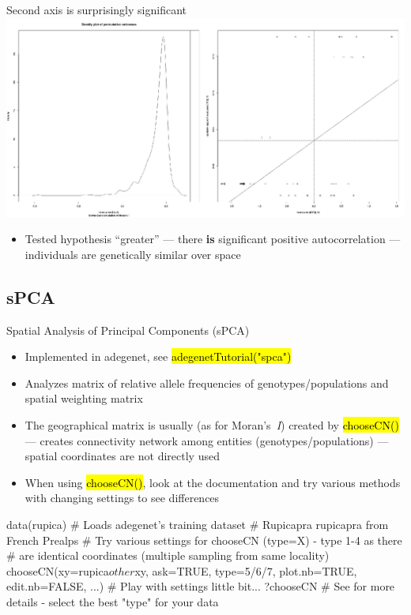 \documentclass[compress, ucs, xelatex, 11pt, xcolor=svgnames,
	hyperref={
		bookmarks=true,
		unicode=true,
		colorlinks=true,
		pdftitle={Molecular data in R},
		plainpages=false,
		pdfauthor={Vojtech Zeisek},
		pdfsubject={Course about phylogeny and evolution in R},
		pdfcreator={XeLaTeX},
		pdfkeywords={R, evolution, phylogeny, molecular data},
		linkcolor=Tomato,
		anchorcolor=SaddleBrown,
		citecolor=Goldenrod,
		filecolor=DarkMagenta,
		menucolor=Sienna,
		urlcolor=DarkTurquoise,
		pdftex},
	url={hyphens, lowtilde} %
	]{beamer}
\renewcommand{\texttt}[1]{\hl{\ttfamily #1}}
\begin{document}
\begin{frame}{Second axis is surprisingly significant}
	\includegraphics[width=\textwidth]{moran2.png}
	\begin{itemize}
		\item Tested hypothesis ``greater'' --- there \textbf{is} significant positive autocorrelation --- individuals are genetically similar over space
	\end{itemize}
\end{frame}

\subsection{sPCA}

\begin{frame}[fragile]{Spatial Analysis of Principal Components (sPCA)}
	\begin{itemize}
		\item Implemented in adegenet, see \texttt{adegenetTutorial("spca")}
		\item Analyzes matrix of relative allele frequencies of genotypes/populations and spatial weighting matrix
		\item The geographical matrix is usually (as for Moran's~\textit{I}) created by \texttt{chooseCN()} --- creates connectivity network among entities (genotypes/populations) --- spatial coordinates are not directly used
		\item When using \texttt{chooseCN()}, look at the documentation and try various methods with changing settings to see differences
	\end{itemize}
	\begin{spluscode}
    data(rupica) # Loads adegenet's training dataset
                 # Rupicapra rupicapra from French Prealps
    # Try various settings for chooseCN (type=X) - type 1-4 as there
    # are identical coordinates (multiple sampling from same locality)
    chooseCN(xy=rupica$other$xy, ask=TRUE, type=5/6/7, plot.nb=TRUE,
      edit.nb=FALSE, ...) # Play with settings little bit...
    ?chooseCN # See for more details - select the best "type" for your data
	\end{spluscode}
\end{frame}
\end{document}
